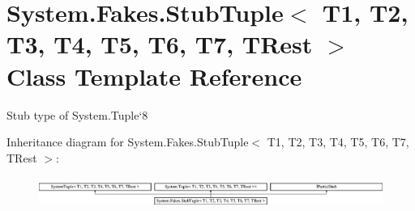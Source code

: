\hypertarget{class_system_1_1_fakes_1_1_stub_tuple_3_01_t1_00_01_t2_00_01_t3_00_01_t4_00_01_t5_00_01_t6_00_01_t7_00_01_t_rest_01_4}{\section{System.\-Fakes.\-Stub\-Tuple$<$ T1, T2, T3, T4, T5, T6, T7, T\-Rest $>$ Class Template Reference}
\label{class_system_1_1_fakes_1_1_stub_tuple_3_01_t1_00_01_t2_00_01_t3_00_01_t4_00_01_t5_00_01_t6_00_01_t7_00_01_t_rest_01_4}
}


Stub type of System.\-Tuple`8 


Inheritance diagram for System.\-Fakes.\-Stub\-Tuple$<$ T1, T2, T3, T4, T5, T6, T7, T\-Rest $>$\-:\begin{figure}[H]
\begin{center}
\leavevmode
\includegraphics[height=0.998218cm]{class_system_1_1_fakes_1_1_stub_tuple_3_01_t1_00_01_t2_00_01_t3_00_01_t4_00_01_t5_00_01_t6_00_01_t7_00_01_t_rest_01_4}
\end{center}
\end{figure}
